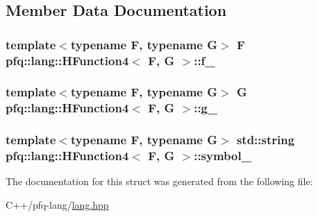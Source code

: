 \subsection{Member Data Documentation}
\hypertarget{structpfq_1_1lang_1_1HFunction4_ad117b24d6ba99724581c1ec2ee7591b6}{
\subsubsection[{f\+\_\+}]{\setlength{\rightskip}{0pt plus 5cm}template$<$typename F, typename G$>$ F {\bf pfq\+::lang\+::\+H\+Function4}$<$ F, G $>$\+::f\+\_\+}}\label{structpfq_1_1lang_1_1HFunction4_ad117b24d6ba99724581c1ec2ee7591b6}
\hypertarget{structpfq_1_1lang_1_1HFunction4_a1a9a821806c773b379940a042d2de595}{
\subsubsection[{g\+\_\+}]{\setlength{\rightskip}{0pt plus 5cm}template$<$typename F, typename G$>$ G {\bf pfq\+::lang\+::\+H\+Function4}$<$ F, G $>$\+::g\+\_\+}}\label{structpfq_1_1lang_1_1HFunction4_a1a9a821806c773b379940a042d2de595}
\hypertarget{structpfq_1_1lang_1_1HFunction4_ac7c063e108f068b576f4b7c370e8b75e}{
\subsubsection[{symbol\+\_\+}]{\setlength{\rightskip}{0pt plus 5cm}template$<$typename F, typename G$>$ std\+::string {\bf pfq\+::lang\+::\+H\+Function4}$<$ F, G $>$\+::symbol\+\_\+}}\label{structpfq_1_1lang_1_1HFunction4_ac7c063e108f068b576f4b7c370e8b75e}


The documentation for this struct was generated from the following file\+:\begin{DoxyCompactItemize}
\item 
C++/pfq-\/lang/\hyperlink{lang_8hpp}{lang.\+hpp}\end{DoxyCompactItemize}
